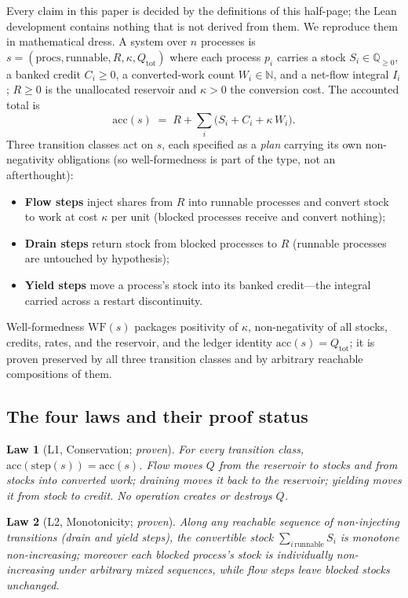 \documentclass[11pt]{article}
\newtheorem{law}{Law}
\begin{document}
Every claim in this paper is decided by the definitions of this
half-page; the Lean development contains nothing that is not derived
from them. We reproduce them in mathematical dress. A system over $n$ processes is
$s = (\mathrm{procs}, \mathrm{runnable}, R, \kappa, Q_{\mathrm{tot}})$
where each process $p_i$ carries a stock $S_i \in \mathbb{Q}_{\ge 0}$, a
banked credit $C_i \ge 0$, a converted-work count $W_i \in \mathbb{N}$,
and a net-flow integral $I_i$; $R \ge 0$ is the unallocated reservoir
and $\kappa > 0$ the conversion cost. The accounted total is
\[
\mathrm{acc}(s) \;=\; R + \sum_i \bigl(S_i + C_i + \kappa\, W_i\bigr).
\]
Three transition classes act on $s$, each specified as a \emph{plan}
carrying its own non-negativity obligations (so well-formedness is part
of the type, not an afterthought):
\begin{itemize}
\item \textbf{Flow steps} inject shares from $R$ into runnable
  processes and convert stock to work at cost $\kappa$ per unit
  (blocked processes receive and convert nothing);
\item \textbf{Drain steps} return stock from blocked processes to $R$
  (runnable processes are untouched by hypothesis);
\item \textbf{Yield steps} move a process's stock into its banked
  credit---the integral carried across a restart discontinuity.
\end{itemize}
Well-formedness $\mathrm{WF}(s)$ packages positivity of $\kappa$,
non-negativity of all stocks, credits, rates, and the reservoir, and
the ledger identity $\mathrm{acc}(s) = Q_{\mathrm{tot}}$; it is proven
preserved by all three transition classes and by arbitrary reachable
compositions of them.

\subsection{The four laws and their proof status}
\label{sec:laws}

\begin{law}[L1, Conservation; \emph{proven}]
For every transition class,
$\mathrm{acc}(\mathrm{step}(s)) = \mathrm{acc}(s)$.
Flow moves $Q$ from the reservoir to stocks and from stocks into
converted work; draining moves it back to the reservoir; yielding moves
it from stock to credit. No operation creates or destroys $Q$.
\end{law}

\begin{law}[L2, Monotonicity; \emph{proven}]
\label{law:l2}
Along any reachable sequence of \emph{non-injecting} transitions (drain
and yield steps), the convertible stock
$\sum_{i\,\mathrm{runnable}} S_i$ is monotone non-increasing; moreover
each blocked process's stock is individually non-increasing under
arbitrary mixed sequences, while flow steps leave blocked stocks
unchanged.
\end{law}
\end{document}
